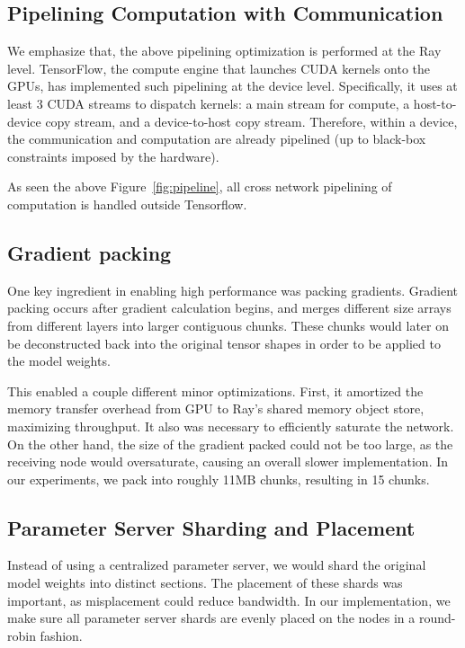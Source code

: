 \subsection{Pipelining Computation with Communication}

We emphasize that, the above pipelining optimization is performed at the Ray level.  TensorFlow, the compute engine that launches CUDA kernels onto the GPUs, has implemented such pipelining at the device level.  Specifically, it uses at least 3 CUDA streams to dispatch kernels: a main stream for compute, a host-to-device copy stream, and a device-to-host copy stream.  Therefore, within a device, the communication and computation are already pipelined (up to black-box constraints imposed by the hardware).


As seen the above Figure~\ref{fig:pipeline}, all cross network pipelining of computation is handled outside Tensorflow.

\subsection{Gradient packing}
One key ingredient in enabling high performance was packing gradients. Gradient packing occurs after gradient calculation begins, and merges different size arrays from different layers into larger contiguous chunks. These chunks would later on be deconstructed back into the original tensor shapes in order to be applied to the model weights.

This enabled a couple different minor optimizations. First, it amortized the memory transfer overhead from GPU to Ray's shared memory object store, maximizing throughput. It also was necessary to efficiently saturate the network. On the other hand, the size of the gradient packed could not be too large, as the receiving node would oversaturate, causing an overall slower implementation. In our experiments, we pack into roughly 11MB chunks, resulting in 15 chunks.

\subsection{Parameter Server Sharding and Placement}
Instead of using a centralized parameter server, we would shard the original model weights into distinct sections. The placement of these shards was important, as misplacement could reduce bandwidth. In our implementation, we make sure all parameter server shards are evenly placed on the nodes in a round-robin fashion.

